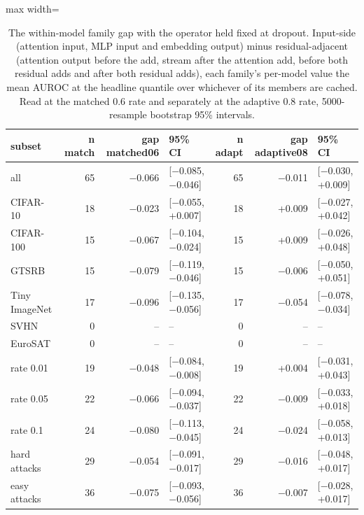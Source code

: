 \begin{table}[htbp]
\centering
\small
\caption{The within-model family gap with the operator held fixed at dropout. Input-side (attention input, MLP input and embedding output) minus residual-adjacent (attention output before the add, stream after the attention add, before both residual adds and after both residual adds), each family's per-model value the mean AUROC at the headline quantile over whichever of its members are cached. Read at the matched 0.6 rate and separately at the adaptive 0.8 rate, 5000-resample bootstrap 95\% intervals.}
\label{tab:family-split-dropout}
\begin{adjustbox}{max width=\linewidth}
\begin{tabular}{lrrlrrl}
\toprule
subset & n match & gap matched06 & 95\% CI & n adapt & gap adaptive08 & 95\% CI \\
\midrule
all & 65 & $-$0.066 & [$-$0.085, $-$0.046] & 65 & $-$0.011 & [$-$0.030, +0.009] \\
CIFAR-10 & 18 & $-$0.023 & [$-$0.055, +0.007] & 18 & +0.009 & [$-$0.027, +0.042] \\
CIFAR-100 & 15 & $-$0.067 & [$-$0.104, $-$0.024] & 15 & +0.009 & [$-$0.026, +0.048] \\
GTSRB & 15 & $-$0.079 & [$-$0.119, $-$0.046] & 15 & $-$0.006 & [$-$0.050, +0.051] \\
Tiny ImageNet & 17 & $-$0.096 & [$-$0.135, $-$0.056] & 17 & $-$0.054 & [$-$0.078, $-$0.034] \\
SVHN & 0 & -- & -- & 0 & -- & -- \\
EuroSAT & 0 & -- & -- & 0 & -- & -- \\
rate 0.01 & 19 & $-$0.048 & [$-$0.084, $-$0.008] & 19 & +0.004 & [$-$0.031, +0.043] \\
rate 0.05 & 22 & $-$0.066 & [$-$0.094, $-$0.037] & 22 & $-$0.009 & [$-$0.033, +0.018] \\
rate 0.1 & 24 & $-$0.080 & [$-$0.113, $-$0.045] & 24 & $-$0.024 & [$-$0.058, +0.013] \\
hard attacks & 29 & $-$0.054 & [$-$0.091, $-$0.017] & 29 & $-$0.016 & [$-$0.048, +0.017] \\
easy attacks & 36 & $-$0.075 & [$-$0.093, $-$0.056] & 36 & $-$0.007 & [$-$0.028, +0.017] \\
\bottomrule
\end{tabular}
\end{adjustbox}
\end{table}
